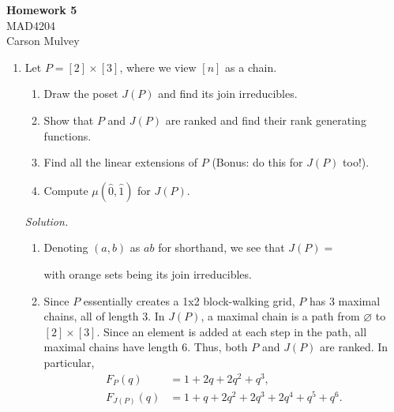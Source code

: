\documentclass[11pt,letterpaper,dvipsnames]{article}
\newenvironment{solution}{\color{SeaGreen}\textit{Solution.}}{\color{black}}
\begin{document}
\flushleft

\begin{center}
    \begin{large}
        \textbf{Homework 5} \\
        MAD4204 \\ 
        Carson Mulvey
    \end{large}
\end{center}

\pagestyle{empty}


\flushleft
\begin{enumerate}

\item Let $P = [2] \times [3]$, where we view $[n]$ as a chain.
\begin{enumerate}
	\item Draw the poset $J(P)$ and find its join irreducibles.
	\item Show that $P$ and $J(P)$ are ranked and find their rank generating functions.
	\item Find all the linear extensions of $P$ (Bonus: do this for $J(P)$ too!).
	\item Compute $\mu(\hat{0},\hat{1})$ for $J(P)$.
\end{enumerate}
\begin{solution}
\begin{enumerate}
    \item Denoting $(a,b)$ as $ab$ for shorthand, we see that $J(P)=$ 
    
    
    with {\color{orange} orange} sets being its join irreducibles.
    
    \item Since $P$ essentially creates a 1x2 block-walking grid, $P$ has $3$ maximal chains, all of length $3$. In $J(P)$, a maximal chain is a path from $\varnothing$ to $[2]\times[3]$. Since an element is added at each step in the path, all maximal chains have length $6$. Thus, both $P$ and $J(P)$ are ranked. In particular, 
    \begin{align*}
        F_P(q) &= 1+2q+2q^2+q^3, \\
        F_{J(P)}(q) &= 1+q+2q^2+2q^3+2q^4+q^5+q^6.
    \end{align*}
    

\end{enumerate}
\end{solution}
\end{enumerate}
\end{document}
